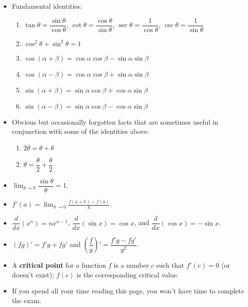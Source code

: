 \documentclass[12pt]{article}
\newcommand{\ds}{\displaystyle}
\begin{document}
\begin{itemize}
\item Fundamental identities:
\begin{enumerate}
 \item $\tan\theta = \dfrac{\sin\theta}{\cos\theta}$, $\cot\theta = \dfrac{\cos\theta}{\sin\theta}$, $\sec\theta = \dfrac{1}{\cos\theta}$, $\csc\theta = \dfrac{1}{\sin\theta}$
 \item $\cos^2\theta + \sin^2\theta =1$
 \item $\cos(\alpha + \beta) = \cos\alpha\cos\beta - \sin\alpha\sin\beta$
 \item $\cos(\alpha - \beta) = \cos\alpha\cos\beta + \sin\alpha\sin\beta$
 \item $\sin(\alpha + \beta) = \sin\alpha\cos\beta + \cos\alpha\sin\beta$
 \item $\sin(\alpha - \beta) = \sin\alpha\cos\beta - \cos\alpha\sin\beta$
\end{enumerate}
\item Obvious but occasionally forgotten facts that are sometimes useful in conjunction with some of the identities above:
\begin{enumerate}
 \item $2\theta = \theta + \theta$
 \item $\theta = \dfrac{\theta}{2}+\dfrac{\theta}{2}$
\end{enumerate}
 \item $\lim_{\theta\to 0}\dfrac{\sin\theta}{\theta} = 1$.
 \item $\ds f'(a) = \lim_{h\to 0}\frac{f(a+h)-f(a)}{h}$.
 \item $\dfrac{d}{dx}(x^n) = nx^{n-1}$, $\dfrac{d}{dx}(\sin x) = \cos x$, and $\dfrac{d}{dx}(\cos x) = -\sin x$.
 \item $(fg)' = f'g+fg'$ and $\left(\dfrac{f}{g}\right)' = \dfrac{f'g-fg'}{g^2}$.
 \item A {\bf critical point} for a function $f$ is a number $c$ such that $f'(c)=0$ (or doesn't exist); $f(c)$ is the corresponding critical value.
 \item If you spend all your time reading this page, you won't have time to complete the exam.
\end{itemize}
\end{document}
